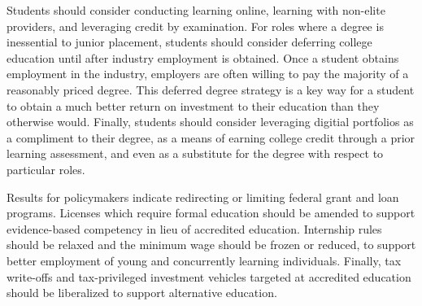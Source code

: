 \documentclass[AER]{./aea-latex-templates/AEA}
\begin{document}
        Students should consider conducting learning online, learning with non-elite providers,
        and leveraging credit by examination.
        For roles where a degree is inessential to junior placement, students should consider
        deferring college education until after industry employment is obtained.
        Once a student obtains employment in the industry, employers are often willing to pay the majority of a reasonably priced degree.
        This deferred degree strategy is a key way for a student to obtain a much better return on investment to their education than they otherwise would.
        Finally, students should consider leveraging digitial portfolios as a compliment to their degree,
        as a means of earning college credit through a prior learning assessment,
        and even as a substitute for the degree with respect to particular roles.
        
        Results for policymakers indicate redirecting or limiting federal grant and loan programs.
        Licenses which require formal education should be amended to support evidence-based competency in lieu of accredited education.
        Internship rules should be relaxed and the minimum wage should be frozen or reduced,
        to support better employment of young and concurrently learning individuals.
        Finally, tax write-offs and tax-privileged
        investment vehicles targeted at accredited education should be liberalized
        to support alternative education.
        
        
        
        
        
\end{document}
